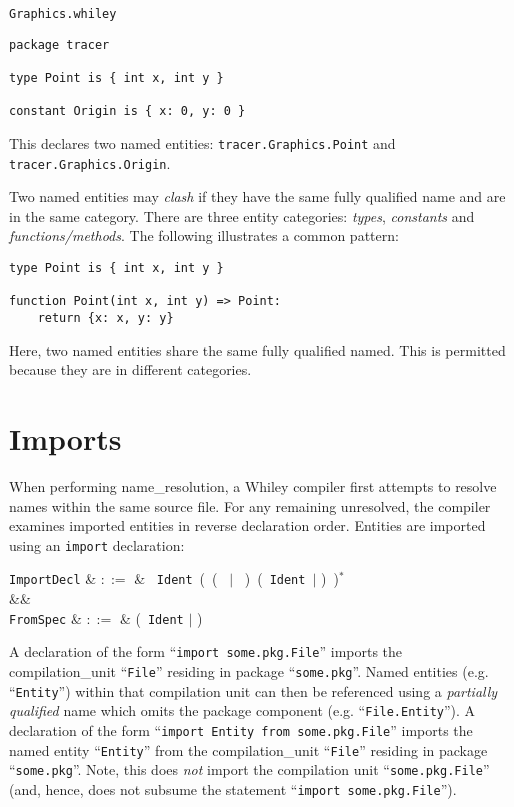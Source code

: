 \noindent \verb+Graphics.whiley+
\begin{lstlisting}
package tracer

type Point is { int x, int y }

constant Origin is { x: 0, y: 0 } 
\end{lstlisting}
This declares two named entities: \lstinline{tracer.Graphics.Point} and \lstinline{tracer.Graphics.Origin}.  

Two named entities may {\em clash} if they have the same fully qualified name and are in the same category.  There are three entity categories: {\em types}, {\em constants} and {\em functions/methods}.  The following illustrates a common pattern:

\begin{lstlisting}
type Point is { int x, int y }

function Point(int x, int y) => Point:
    return {x: x, y: y}
\end{lstlisting}

Here, two named entities share the same fully qualified named.  This is permitted because they are in different categories.


\section{Imports}

When performing \gls{name_resolution}, a Whiley compiler first attempts to resolve names within the same source file.  For any remaining unresolved, the compiler examines imported entities in reverse declaration order.  Entities are imported using an \lstinline{import} declaration:

\begin{syntax}
\verb+ImportDecl+ & $::=$ &  \ \verb+Ident+\ \Big(\ \big(\  $|$ \ \big)\ \big(\ \verb+Ident+\ $|$ \token{*}\big)\ \Big)$^*$\\
&&\\
\verb+FromSpec+ & $::=$ & \big(\ \verb+Ident+ $|$ \token{*} \big) \\
\end{syntax}

A declaration of the form ``\lstinline{import some.pkg.File}'' imports the \gls{compilation_unit} ``\lstinline{File}'' residing in package ``\lstinline{some.pkg}''.  Named entities (e.g. ``\lstinline{Entity}'') within that compilation unit can then be referenced using a {\em partially qualified} name which omits the package component (e.g. ``\lstinline{File.Entity}'').  A declaration of the form ``\lstinline{import Entity from some.pkg.File}'' imports the named entity ``\lstinline{Entity}'' from the \gls{compilation_unit} ``\lstinline{File}'' residing in package ``\lstinline{some.pkg}''.  Note, this does {\em not} import the compilation unit ``\lstinline{some.pkg.File}'' (and, hence, does not subsume the statement ``\lstinline{import some.pkg.File}'').

